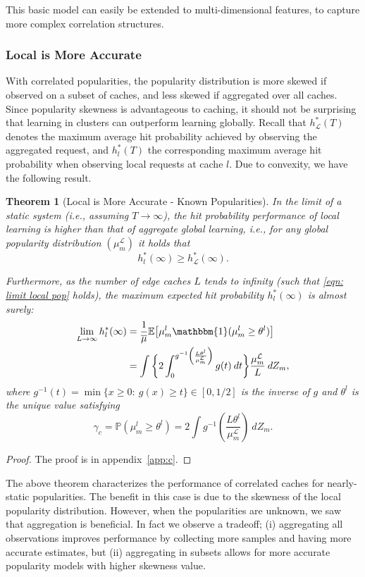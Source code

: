 \documentclass[10pt, conference, letterpaper]{IEEEtran}
\newcommand{\mean}[1]{\mathbb{E}\!\left[#1\right]}
\newcommand{\prob}[1]{\mathbb{P}\!\left(#1\right)}
\newtheorem{theorem}{Theorem}
\def\ind{\mathbbm{1}}
\begin{document}
This basic model can easily be extended to multi-dimensional features, to capture more complex correlation structures.

\subsubsection{Local is More Accurate}
With correlated popularities, the popularity distribution is more skewed if observed on a subset of caches, and less skewed if aggregated over all caches. Since popularity skewness is advantageous to caching, it should not be surprising that learning in clusters can outperform learning globally.
Recall that 
${h_\mathcal L^*(T)}$ denotes the maximum average hit probability achieved by observing the aggregated request, and ${h_l^*}(T)$ the corresponding maximum average hit probability when observing local requests at cache $l$. 
Due to convexity, we have the following result.


\begin{theorem}[Local is More Accurate - Known Popularities]\label{th:corr}
In the limit of a static system (i.e., assuming $T\to\infty$), the hit probability performance of local learning is higher than that of aggregate global learning, i.e., for any global popularity distribution $(\mu_m^\mathcal L)$ it holds that
\[
{h_l^*}(\infty)\geq {h_\mathcal L^*}(\infty).
\]

Furthermore, 
as the number of edge caches $L$ tends to infinity (such that \eqref{eqn: limit local pop} holds), the maximum expected hit probability ${h_l^*}(\infty)$ is almost surely:
\begin{align*}
\lim_{L\to\infty}{h_l^*}(\infty)&=\frac{1}{\overline\mu}\mean{\mu_m^l\ind(\mu_m^l\geq\theta^l)}\\
&=\int\bigg\{2\int_0^{g^{-1}\left(\frac{L\theta^l}{\mu_m^\mathcal L}\right)} g(t) \:dt\bigg\}\frac{\mu_m^\mathcal L}L\:dZ_m,
\end{align*}
where $g^{-1}(t)=\min\{x\geq0:\:g(x)\geq t\}\in[0,1/2]$ is the inverse of $g$ and $\theta^l$ is the unique value satisfying
\[
\gamma_c=\prob{\mu_m^l\geq\theta^l}=2\int g^{-1}\left(\frac{L\theta^l}{\mu_m^\mathcal L}\right)\:dZ_m.
\]
\end{theorem}
\begin{proof}
The proof is in appendix~\ref{app:c}.
\end{proof}




The above theorem characterizes the performance of correlated caches for nearly-static popularities.
The benefit in this case is due to the skewness of the local popularity distribution. 
However, when the popularities are unknown, we saw that aggregation is beneficial. In fact we observe a tradeoff; (i) aggregating all observations improves performance by collecting more samples and having more accurate estimates, but (ii) aggregating in subsets allows for more accurate popularity models with higher skewness value. 
\end{document}
